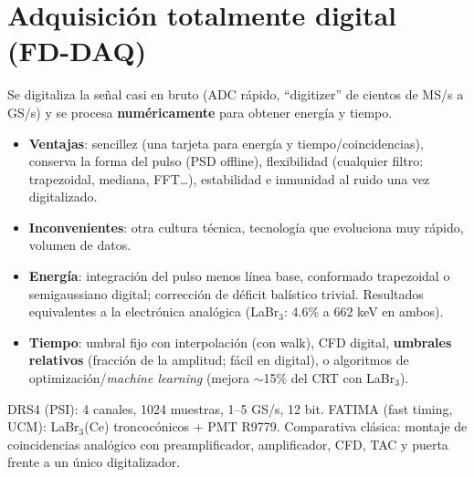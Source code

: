 \section{Adquisición totalmente digital (FD-DAQ)}
\begin{clave}
Se digitaliza la señal casi en bruto (ADC rápido, ``digitizer'' de cientos de MS/s a GS/s) y se procesa \textbf{numéricamente} para obtener energía y tiempo.
\begin{itemize}
\item \textbf{Ventajas}: sencillez (una tarjeta para energía y tiempo/coincidencias), conserva la forma del pulso (PSD offline),
flexibilidad (cualquier filtro: trapezoidal, mediana, FFT\dots), estabilidad e inmunidad al ruido una vez digitalizado.
\item \textbf{Inconvenientes}: otra cultura técnica, tecnología que evoluciona muy rápido, volumen de datos.
\item \textbf{Energía}: integración del pulso menos línea base, conformado trapezoidal o semigaussiano digital; corrección de déficit balístico trivial.
Resultados equivalentes a la electrónica analógica (LaBr$_3$: 4.6\% a 662 keV en ambos).
\item \textbf{Tiempo}: umbral fijo con interpolación (con walk), CFD digital, \textbf{umbrales relativos} (fracción de la amplitud; fácil en digital),
o algoritmos de optimización/\emph{machine learning} (mejora $\sim$15\% del CRT con LaBr$_3$).
\end{itemize}
\end{clave}
\begin{dato}
DRS4 (PSI): 4 canales, 1024 muestras, 1--5 GS/s, 12 bit. FATIMA (fast timing, UCM): LaBr$_3$(Ce) troncocónicos + PMT R9779.
Comparativa clásica: montaje de coincidencias analógico con preamplificador, amplificador, CFD, TAC y puerta frente a un único digitalizador.
\end{dato}
